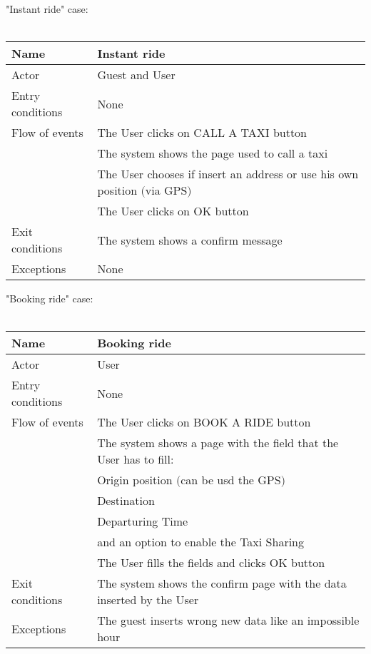 \newpage
"Instant ride" case:
\\
\\
\begin{tabular}{|l|p{10cm}|} 
\hline
Name & Instant ride\\
\hline
Actor & Guest and User\\
\hline
Entry conditions & None\\
\hline
Flow of events
			&	\tabitem The User clicks on CALL A TAXI button\\
			&	\tabitem The system shows the page used to call a taxi\\
			&	\tabitem The User chooses if insert an address or use his own position $($via GPS$)$\\
			&	\tabitem The User clicks on OK button\\
\hline
Exit conditions & The system shows a confirm message\\
\hline
Exceptions & None\\
\hline
\end {tabular}


\newpage
"Booking ride" case:
\\
\\
\begin{tabular}{|l|p{10cm}|} 
\hline
Name & Booking ride\\
\hline
Actor & User\\
\hline
Entry conditions & None\\
\hline
Flow of events
			&	\tabitem The User clicks on BOOK A RIDE button\\
			&	\tabitem The system shows a page with the field that the User has to fill:\\
			&	\tabtratt Origin position $($can be usd the GPS$)$\\
			&	\tabtratt Destination\\
			&	\tabtratt Departuring Time\\
			&	and an option to enable the Taxi Sharing\\
			&	\tabitem The User fills the fields and clicks OK button\\
\hline
Exit conditions & The system shows the confirm page with the data inserted by the User\\
\hline
Exceptions & The guest inserts wrong new data like an impossible hour\\
\hline
\end {tabular}


